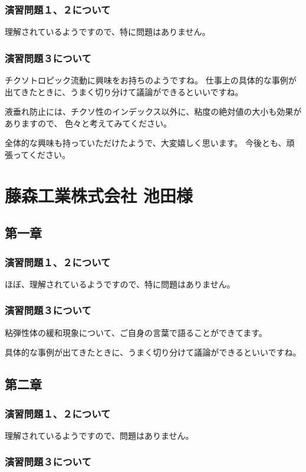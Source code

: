 \documentclass[uplatex,dvipdfmx,a4paper,11pt]{jsreport}
\begin{document}
\subsubsection*{演習問題１、２について}
理解されているようですので、特に問題はありません。

\subsubsection*{演習問題３について}

チクソトロピック流動に興味をお持ちのようですね。
仕事上の具体的な事例が出てきたときに、うまく切り分けて議論ができるといいですね。

液垂れ防止には、チクソ性のインデックス以外に、粘度の絶対値の大小も効果がありますので、
色々と考えてみてください。

全体的な興味も持っていただけたようで、大変嬉しく思います。
今後とも、頑張ってください。

\clearpage

\section*{藤森工業株式会社 池田様}
\subsection*{第一章}
\subsubsection*{演習問題１、２について}
ほぼ、理解されているようですので、特に問題はありません。

\subsubsection*{演習問題３について}
粘弾性体の緩和現象について、ご自身の言葉で語ることができてます。

具体的な事例が出てきたときに、うまく切り分けて議論ができるといいですね。

\subsection*{第二章}
\subsubsection*{演習問題１、２について}
理解されているようですので、問題はありません。


\subsubsection*{演習問題３について}
\end{document}
